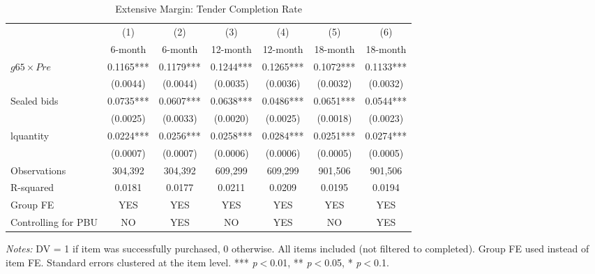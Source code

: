 \begin{table}[htbp]
\centering
\caption{Extensive Margin: Tender Completion Rate}
\label{tab:extensive}
\begin{adjustbox}{max width=\textwidth}
\begin{threeparttable}
\small
\begin{tabular}{lcccccc}
\toprule
 & (1) & (2) & (3) & (4) & (5) & (6) \\
 & 6-month & 6-month & 12-month & 12-month & 18-month & 18-month \\
\midrule
$g65 \times Pre$ & 0.1165*** & 0.1179*** & 0.1244*** & 0.1265*** & 0.1072*** & 0.1133*** \\
 & (0.0044) & (0.0044) & (0.0035) & (0.0036) & (0.0032) & (0.0032) \\
Sealed bids & 0.0735*** & 0.0607*** & 0.0638*** & 0.0486*** & 0.0651*** & 0.0544*** \\
 & (0.0025) & (0.0033) & (0.0020) & (0.0025) & (0.0018) & (0.0023) \\
lquantity & 0.0224*** & 0.0256*** & 0.0258*** & 0.0284*** & 0.0251*** & 0.0274*** \\
 & (0.0007) & (0.0007) & (0.0006) & (0.0006) & (0.0005) & (0.0005) \\
\midrule
Observations & 304,392 & 304,392 & 609,299 & 609,299 & 901,506 & 901,506 \\
R-squared & 0.0181 & 0.0177 & 0.0211 & 0.0209 & 0.0195 & 0.0194 \\
Group FE & YES & YES & YES & YES & YES & YES \\
Controlling for PBU & NO & YES & NO & YES & NO & YES \\
\bottomrule
\end{tabular}
\begin{tablenotes}
\small
\item \textit{Notes:} DV = 1 if item was successfully purchased, 0 otherwise. All items included (not filtered to completed).
Group FE used instead of item FE. Standard errors clustered at the item level.
*** \textit{p}$<$0.01, ** \textit{p}$<$0.05, * \textit{p}$<$0.1.
\end{tablenotes}
\end{threeparttable}
\end{adjustbox}
\end{table}
